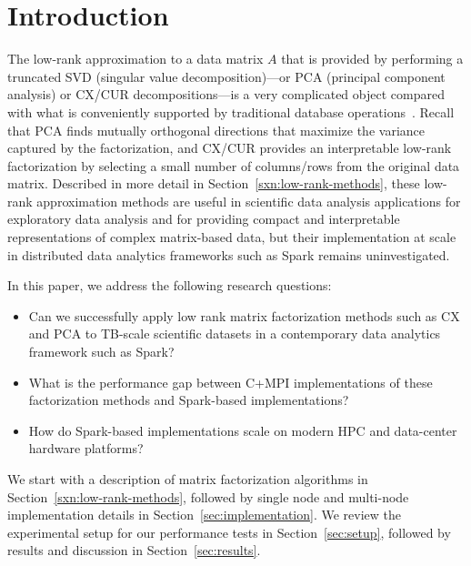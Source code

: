 \section{Introduction}
\label{sec:intro}

The low-rank approximation to a data matrix $A$ that is provided by performing
a truncated SVD (singular value decomposition)---or PCA (principal component
analysis) or CX/CUR decompositions---is a very complicated object compared with
what is conveniently supported by traditional database
operations~\cite{Skillicorn07}. Recall that PCA finds mutually orthogonal
directions that maximize the variance captured by the factorization, and CX/CUR
provides an interpretable low-rank factorization by selecting a small number of
columns/rows from the original data matrix.  Described in more detail in
Section~\ref{sxn:low-rank-methods}, these low-rank approximation methods are
useful in scientific data analysis applications for exploratory data analysis
and for providing compact and interpretable representations of complex
matrix-based data, but their implementation at scale in distributed data
analytics frameworks such as Spark remains uninvestigated.

In this paper, we address the following research questions:
\begin{itemize}
  \item Can we successfully apply low rank matrix factorization methods such as
    CX and PCA to TB-scale scientific datasets in a contemporary data analytics
    framework such as Spark?

  \item What is the performance gap between C+MPI implementations of these
    factorization methods and Spark-based implementations? 

  \item How do Spark-based implementations scale on modern HPC and data-center
    hardware platforms?
\end{itemize}

We start with a description of matrix factorization algorithms in
Section~\ref{sxn:low-rank-methods}, followed by single node and multi-node
implementation details in Section~\ref{sec:implementation}. We review the
experimental setup for our performance tests in Section~\ref{sec:setup},
followed by results and discussion in Section~\ref{sec:results}.

